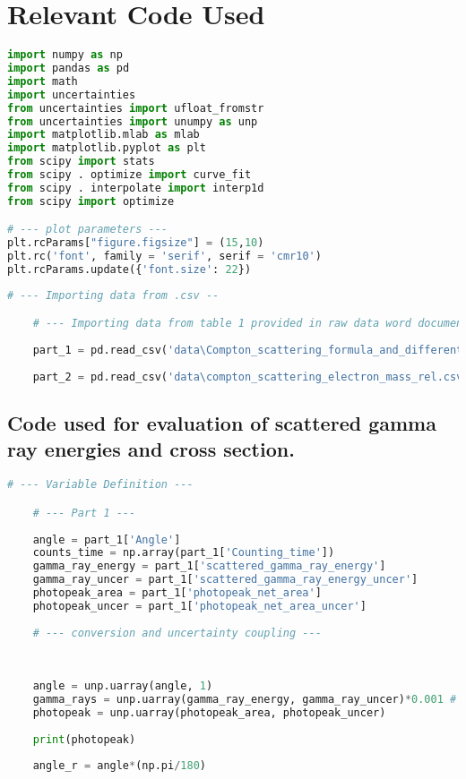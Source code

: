 \newpage 

\section{Relevant Code Used} \label{code} 

\begin{lstlisting}[language = Python, frame = single, caption = {Package Import}]
import numpy as np 
import pandas as pd 
import math
import uncertainties
from uncertainties import ufloat_fromstr
from uncertainties import unumpy as unp
import matplotlib.mlab as mlab
import matplotlib.pyplot as plt
from scipy import stats
from scipy . optimize import curve_fit
from scipy . interpolate import interp1d
from scipy import optimize

# --- plot parameters --- 
plt.rcParams["figure.figsize"] = (15,10)
plt.rc('font', family = 'serif', serif = 'cmr10') 
plt.rcParams.update({'font.size': 22})
\end{lstlisting}

\begin{lstlisting}[language = Python, frame = single, caption = {Importing data}]
    # --- Importing data from .csv -- 

    # --- Importing data from table 1 provided in raw data word document ---  
    
    part_1 = pd.read_csv('data\Compton_scattering_formula_and_differential_cross_section.csv')
    
    part_2 = pd.read_csv('data\compton_scattering_electron_mass_rel.csv')
\end{lstlisting}

\subsection{Code used for evaluation of scattered gamma ray energies and cross section.}

\begin{lstlisting}[language = Python, frame = single, caption = {Variable Defnition for data analysis}]
    # --- Variable Definition --- 

    # --- Part 1 --- 
    
    angle = part_1['Angle']
    counts_time = np.array(part_1['Counting_time'])
    gamma_ray_energy = part_1['scattered_gamma_ray_energy']
    gamma_ray_uncer = part_1['scattered_gamma_ray_energy_uncer']
    photopeak_area = part_1['photopeak_net_area']
    photopeak_uncer = part_1['photopeak_net_area_uncer']
    
    # --- conversion and uncertainty coupling --- 
    
    
    
    angle = unp.uarray(angle, 1)
    gamma_rays = unp.uarray(gamma_ray_energy, gamma_ray_uncer)*0.001 # conversion from KeV to MeV 
    photopeak = unp.uarray(photopeak_area, photopeak_uncer) 
    
    print(photopeak)
    
    angle_r = angle*(np.pi/180)
\end{lstlisting}

